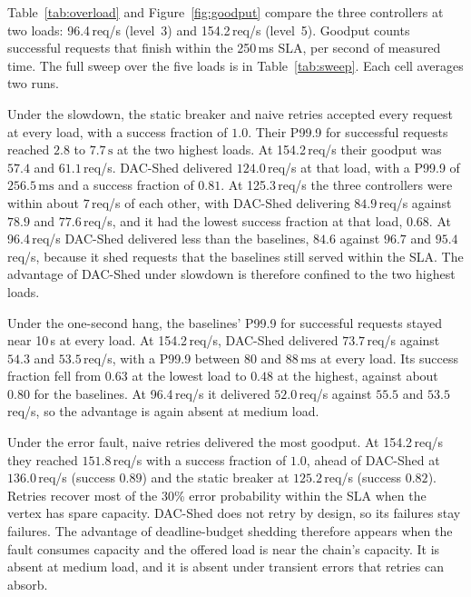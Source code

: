 Table~\ref{tab:overload} and Figure~\ref{fig:goodput} compare the three controllers at two loads: 96.4\,req/s (level~3) and 154.2\,req/s (level~5). Goodput counts successful requests that finish within the 250\,ms SLA, per second of measured time. The full sweep over the five loads is in Table~\ref{tab:sweep}. Each cell averages two runs.





Under the slowdown, the static breaker and naive retries accepted every request at every load, with a success fraction of $1.0$. Their P99.9 for successful requests reached $2.8$ to $7.7\,\mathrm{s}$ at the two highest loads. At 154.2\,req/s their goodput was $57.4$ and $61.1$\,req/s. DAC-Shed delivered $124.0$\,req/s at that load, with a P99.9 of $256.5\,\mathrm{ms}$ and a success fraction of $0.81$. At 125.3\,req/s the three controllers were within about $7$\,req/s of each other, with DAC-Shed delivering $84.9$\,req/s against $78.9$ and $77.6$\,req/s, and it had the lowest success fraction at that load, $0.68$. At 96.4\,req/s DAC-Shed delivered less than the baselines, $84.6$ against $96.7$ and $95.4$\,req/s, because it shed requests that the baselines still served within the SLA. The advantage of DAC-Shed under slowdown is therefore confined to the two highest loads.

Under the one-second hang, the baselines' P99.9 for successful requests stayed near 10\,s at every load. At 154.2\,req/s, DAC-Shed delivered $73.7$\,req/s against $54.3$ and $53.5$\,req/s, with a P99.9 between $80$ and $88\,\mathrm{ms}$ at every load. Its success fraction fell from $0.63$ at the lowest load to $0.48$ at the highest, against about $0.80$ for the baselines. At 96.4\,req/s it delivered $52.0$\,req/s against $55.5$ and $53.5$\,req/s, so the advantage is again absent at medium load.

Under the error fault, naive retries delivered the most goodput. At 154.2\,req/s they reached $151.8$\,req/s with a success fraction of $1.0$, ahead of DAC-Shed at $136.0$\,req/s (success $0.89$) and the static breaker at $125.2$\,req/s (success $0.82$). Retries recover most of the 30\% error probability within the SLA when the vertex has spare capacity. DAC-Shed does not retry by design, so its failures stay failures. The advantage of deadline-budget shedding therefore appears when the fault consumes capacity and the offered load is near the chain's capacity. It is absent at medium load, and it is absent under transient errors that retries can absorb.

